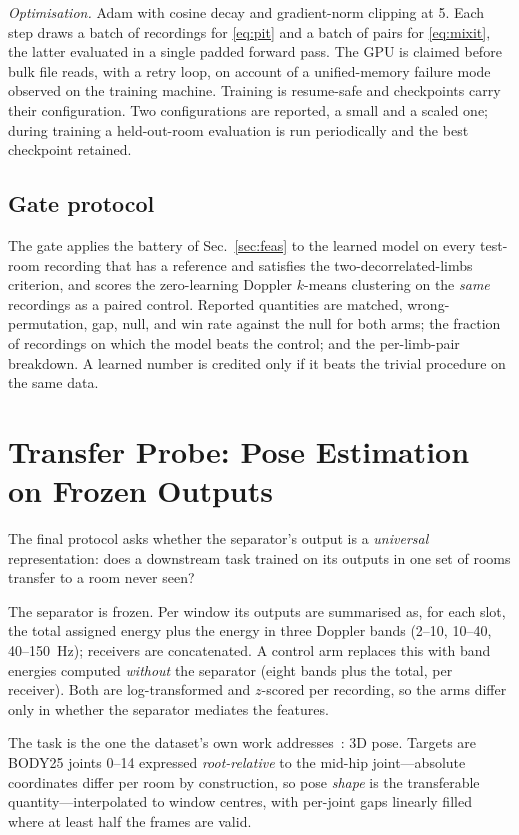 \documentclass[conference]{IEEEtran}
\begin{document}
\emph{Optimisation.} Adam with cosine decay and gradient-norm clipping at
\num{5}. Each step draws a batch of recordings for \eqref{eq:pit} and a batch
of pairs for \eqref{eq:mixit}, the latter evaluated in a single padded forward
pass. The GPU is claimed before bulk file reads, with a retry loop, on account
of a unified-memory failure mode observed on the training machine. Training is
resume-safe and checkpoints carry their configuration. Two configurations are
reported, a small and a scaled one; during training a held-out-room evaluation
is run periodically and the best checkpoint retained.

\subsection{Gate protocol}
\label{sec:gate}

The gate applies the battery of Sec.~\ref{sec:feas} to the learned model on
every test-room recording that has a reference and satisfies the
two-decorrelated-limbs criterion, and scores the zero-learning Doppler
$k$-means clustering on the \emph{same} recordings as a paired control.
Reported quantities are matched, wrong-permutation, gap, null, and win rate
against the null for both arms; the fraction of recordings on which the model
beats the control; and the per-limb-pair breakdown. A learned number is
credited only if it beats the trivial procedure on the same data.

\section{Transfer Probe: Pose Estimation on Frozen Outputs}
\label{sec:transfer}

The final protocol asks whether the separator's output is a \emph{universal}
representation: does a downstream task trained on its outputs in one set of
rooms transfer to a room never seen?

The separator is frozen. Per window its outputs are summarised as, for each
slot, the total assigned energy plus the energy in three Doppler bands
(2--10, 10--40, 40--\SI{150}{\hertz}); receivers are concatenated. A control arm
replaces this with band energies computed \emph{without} the separator (eight
bands plus the total, per receiver). Both are log-transformed and $z$-scored per
recording, so the arms differ only in whether the separator mediates the
features.

The task is the one the dataset's own work addresses~\cite{perceptalign2026}:
3D pose. Targets are BODY25 joints 0--14 expressed \emph{root-relative} to the
mid-hip joint---absolute coordinates differ per room by construction, so pose
\emph{shape} is the transferable quantity---interpolated to window centres,
with per-joint gaps linearly filled where at least half the frames are valid.
\end{document}
